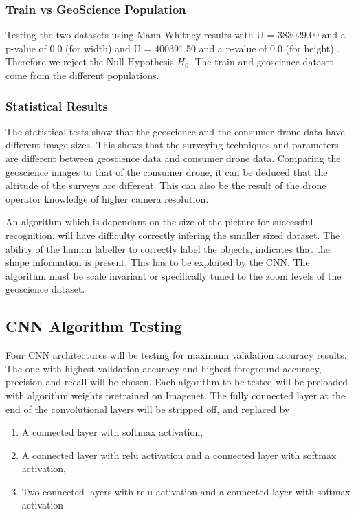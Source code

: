 \documentclass{IEEEtran}
\begin{document}
\subsubsection{Train vs GeoScience Population}

Testing the two datasets using Mann Whitney results with U = 383029.00 and a p-value of 0.0 (for width) and U = 400391.50 and a p-value of 0.0 (for height) . Therefore we reject the Null Hypothesis $H_0$. The train and geoscience dataset come from the different populations. 

\subsubsection{Statistical Results}

The statistical tests show that the geoscience and the consumer drone data have different image sizes. This shows that the surveying techniques and parameters are different between geoscience data and consumer drone data. Comparing the geoscience images to that of the consumer drone, it can be deduced that the altitude of the surveys are different. This can also be the result of the drone operator knowledge of higher camera resolution.\newline

An algorithm which is dependant on the size of the picture for successful recognition, will have difficulty correctly infering the smaller sized dataset. The ability of the human labeller to correctly label the objects, indicates that the shape information is present. This has to be exploited by the CNN. The algorithm must be scale invariant or specifically tuned to the zoom levels of the geoscience dataset.\newline

\subsection{CNN Algorithm Testing}

Four CNN architectures will be testing for maximum validation accuracy results. The one with highest validation accuracy and highest foreground accuracy, precision and recall will be chosen. Each algorithm to be tested will be preloaded with algorithm weights pretrained on Imagenet. The fully connected layer at the end of the convolutional layers will be stripped off, and replaced by
\begin{enumerate}
\item A connected layer with softmax activation,
\item A connected layer with relu activation and a connected layer with softmax activation,
\item Two connected layers with relu activation and a connected layer with softmax activation
\end{enumerate}
\end{document}
